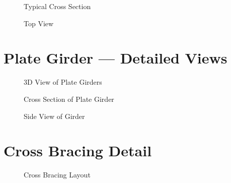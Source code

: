 \documentclass[12pt,a4paper]{report}
\numberwithin{table}{chapter}
\numberwithin{figure}{chapter}
\begin{document}
\begin{figure}[H]
\centering
{}
\caption{Typical Cross Section}
\label{fig:cross-section}
\end{figure}


\begin{figure}[H]
\centering
{}
\caption{Top View}
\label{fig:top-view}
\end{figure}


\section{Plate Girder --- Detailed Views}
\label{sec:girder-views}

\begin{figure}[H]
\centering
{}
\caption{3D View of Plate Girders}
\label{fig:girder-3d}
\end{figure}


\begin{figure}[H]
\centering
{}
\caption{Cross Section of Plate Girder}
\label{fig:girder-xsec}
\end{figure}


\begin{figure}[H]
\centering
{}
\caption{Side View of Girder}
\label{fig:girder-side}
\end{figure}


\section{Cross Bracing Detail}
\label{sec:bracing-detail}

\begin{figure}[H]
\centering
{}
\caption{Cross Bracing Layout}
\label{fig:cb-layout}
\end{figure}
\end{document}
